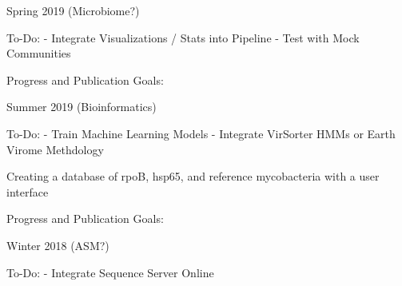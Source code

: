 \documentclass[idxtotoc,hyperref,openany]{labbook} %
\begin{document}
Spring 2019 (Microbiome?)

To-Do:
- Integrate Visualizations / Stats into Pipeline
- Test with Mock Communities




\vspace{0.2cm}
Progress and Publication Goals: 

Summer 2019 (Bioinformatics)

To-Do:
- Train Machine Learning Models
- Integrate VirSorter HMMs or Earth Virome Methdology



Creating a database of rpoB, hsp65, and reference mycobacteria with a user interface

\vspace{0.2cm}
Progress and Publication Goals: 

Winter 2018 (ASM?)

To-Do:
- Integrate Sequence Server Online
\end{document}
